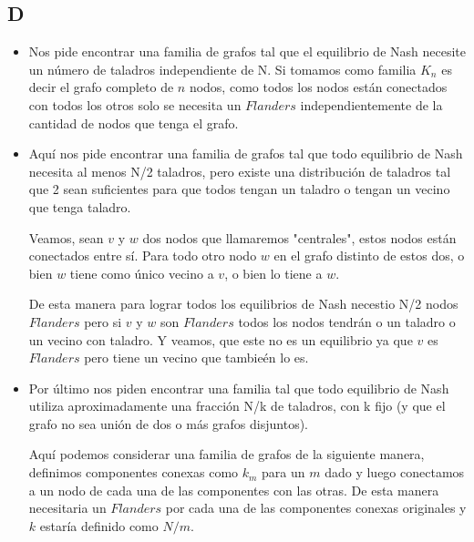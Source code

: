 \documentclass[a4paper]{article}
\begin{document}
\subsection{D}

\begin{itemize}
\item Nos pide encontrar una familia de grafos tal que el equilibrio de Nash necesite un número de taladros independiente de N.
Si tomamos como familia $K_n$ es decir el grafo completo de $n$ nodos, como todos los nodos están conectados con todos los otros solo se necesita un $Flanders$ independientemente de la cantidad de nodos que tenga el grafo.

\item Aquí nos pide encontrar una familia de grafos tal que todo equilibrio de Nash necesita al menos N/2 taladros, pero existe una distribución
de taladros tal que 2 sean suficientes para que todos tengan un taladro o tengan un
vecino que tenga taladro.

Veamos, sean $v$ y $w$ dos nodos que llamaremos "centrales", estos nodos están conectados entre sí. Para todo otro nodo $w$ en el grafo distinto de estos dos, o bien $w$ tiene como único vecino a $v$, o bien lo tiene a $w$.

De esta manera para lograr todos los equilibrios de Nash necestio N/2 nodos $Flanders$ pero si $v$ y $w$ son $Flanders$ todos los nodos tendrán o un taladro o un vecino con taladro. Y veamos, que este no es un equilibrio ya que $v$ es $Flanders$ pero tiene un vecino que tambieén lo es.


\item Por último nos piden encontrar una familia tal que todo equilibrio de Nash utiliza aproximadamente una fracción N/k de taladros,
con k fijo (y que el grafo no sea unión de dos o más grafos disjuntos).

Aquí podemos considerar una familia de grafos de la siguiente manera, definimos componentes conexas como $k_m$ para un $m$ dado y luego conectamos a un nodo de cada una de las componentes con las otras. De esta manera necesitaria un $Flanders$ por cada una de las componentes conexas originales y $k$ estaría definido como $N/m$.

\end{itemize}
\end{document}
